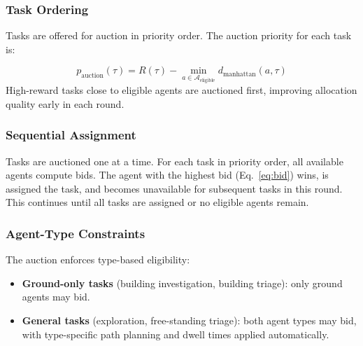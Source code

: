 \documentclass[conference]{IEEEtran}
\begin{document}
\subsubsection{Task Ordering}
Tasks are offered for auction in priority order. The auction priority for each task is:

\begin{equation}
    p_{\text{auction}}(\tau) = R(\tau) - \min_{a \in \mathcal{A}_{\text{eligible}}} d_{\text{manhattan}}(a, \tau)
\end{equation}
High-reward tasks close to eligible agents are auctioned first, improving allocation quality early in each round.

\subsubsection{Sequential Assignment}
Tasks are auctioned one at a time. For each task in priority order, all available agents compute bids. The agent with the highest bid (Eq.~\ref{eq:bid}) wins, is assigned the task, and becomes unavailable for subsequent tasks in this round. This continues until all tasks are assigned or no eligible agents remain.

\subsubsection{Agent-Type Constraints}
The auction enforces type-based eligibility:
\begin{itemize}
    \item \textbf{Ground-only tasks} (building investigation, building triage): only ground agents may bid.
    \item \textbf{General tasks} (exploration, free-standing triage): both agent types may bid, with type-specific path planning and dwell times applied automatically.
\end{itemize}
\end{document}
